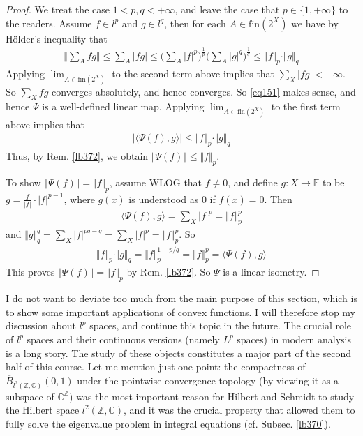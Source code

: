 \documentclass[12pt,b5paper,notitlepage]{article}
\theoremstyle{definition}
\theoremstyle{plain}
\newcommand{\ovl}{\overline}
\newcommand{\bk}[1]{\langle {#1}\rangle}
\newcommand{\Cbb}{\mathbb C}
\newcommand{\Zbb}{\mathbb Z}
\newcommand{\fin}{\mathrm{fin}}
\newcommand{\Fbb}{\mathbb F}
\numberwithin{equation}{section}
\begin{document}
\begin{proof}
We treat the case $1<p,q<+\infty$, and leave the case that $p\in\{1,+\infty\}$ to the readers. Assume $f\in l^p$ and $g\in l^q$, then for each $A\in\fin(2^X)$ we have by H\"older's inequality that
\begin{align*}
\Big\Vert\sum_A fg\Big\Vert\leq \sum_A |fg|\leq \Big(\sum_A|f|^p \Big)^{\frac 1p}\Big(\sum_A|g|^q \Big)^{\frac 1q}\leq \Vert f\Vert_p\cdot\Vert g\Vert_q
\end{align*}
Applying $\lim_{A\in\fin(2^X)}$ to the second term above implies that $\sum_X |fg|<+\infty$. So $\sum_Xfg$ converges absolutely, and hence converges. So \eqref{eq151} makes sense, and hence $\Psi$ is a well-defined linear map. Applying $\lim_{A\in\fin(2^X)}$ to the first term above implies that
\begin{align*}
|\bk{\Psi(f),g}|\leq \Vert f\Vert_p\cdot\Vert g\Vert_q
\end{align*}
Thus, by Rem. \ref{lb372}, we obtain $\Vert\Psi(f)\Vert\leq\Vert f\Vert_p$.

To show $\Vert\Psi(f)\Vert=\Vert f\Vert_p$, assume WLOG that $f\neq 0$, and define $g:X\rightarrow\Fbb$ to be $g=\frac{\ovl f}{|f|}\cdot |f|^{p-1}$, where $g(x)$ is understood as $0$ if $f(x)=0$. Then
\begin{align*}
\bk{\Psi(f),g}=\sum_X |f|^p=\Vert f\Vert_p^p
\end{align*}
and $\Vert g\Vert_q^q=\sum_X |f|^{pq-q}=\sum_X|f|^p=\Vert f\Vert_p^p$. So
\begin{align*}
\Vert f\Vert_p\cdot\Vert g\Vert_q=\Vert f\Vert_p^{1+p/q}=\Vert f\Vert_p^p=\bk{\Psi(f),g}
\end{align*}
This proves $\Vert\Psi(f)\Vert=\Vert f\Vert_p$ by Rem. \ref{lb372}. So $\Psi$ is a linear isometry.
\end{proof}



I do not want to deviate too much from the main purpose of this section, which is to show some important applications of convex functions. I will therefore stop my discussion about $l^p$ spaces, and continue this topic in the future. The crucial role of $l^p$ spaces and their continuous versions (namely $L^p$ spaces) in modern analysis is a long story. The study of these objects constitutes a major part of the second half of this course. Let me mention just one point: the compactness of $\ovl B_{l^2(\Zbb,\Cbb)}(0,1)$ under the pointwise convergence topology (by viewing it as a subspace of $\Cbb^\Zbb$) was the most important reason for Hilbert and Schmidt to study the Hilbert space $l^2(\Zbb,\Cbb)$, and it was the crucial property that allowed them to fully solve the eigenvalue problem in integral equations (cf. Subsec. \ref{lb370}).
\end{document}
